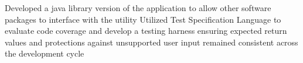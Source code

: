 {%
Developed a java library version of the application to allow other software packages to interface with the utility
}%
{%
Utilized Test Specification Language to evaluate code coverage and develop a testing harness ensuring expected return values and protections against unsupported user input remained consistent across the development cycle
}%
%
%
%
%
%
%
%
%